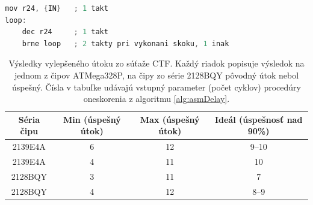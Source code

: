 \begin{lstlisting}[float,language=C,caption={Procedúra oneskorenia v asembleri. \{IN\} označuje vstupný parameter -- 8-bitová konštanta, alebo hodnota v registri.},label=alg:asmDelay]
mov r24, {IN}   ; 1 takt
loop:
    dec r24     ; 1 takt
    brne loop   ; 2 takty pri vykonani skoku, 1 inak
\end{lstlisting}

\begin{table}
    \caption[Výsledky vylepšeného útoku zo súťaže CTF]{Výsledky vylepšeného útoku zo súťaže CTF. Každý riadok popisuje výsledok na jednom z čipov ATMega328P, na čipy zo série 2128BQY pôvodný útok nebol úspešný. Čísla v tabuľke udávajú vstupný parameter (počet cyklov) procedúry oneskorenia z algoritmu \ref{alg:asmDelay}.}
    \label{tab:vccOnTheCheap2}
    \begin{center}
    \begin{tabular}{|c|c|c|c|}
        \hline 
        Séria čipu & Min (úspešný útok) & Max (úspešný útok) & Ideál (úspešnosť nad 90\%) \\
        \hline
        2139E4A & 6 & 12 & 9--10 \\
        \hline
        2139E4A & 4 & 11 & 10 \\
        \hline
        2128BQY & 3 & 11 & 7 \\
        \hline
        2128BQY & 4 & 12 & 8--9 \\
        \hline
    \end{tabular}
    \end{center}
\end{table}

